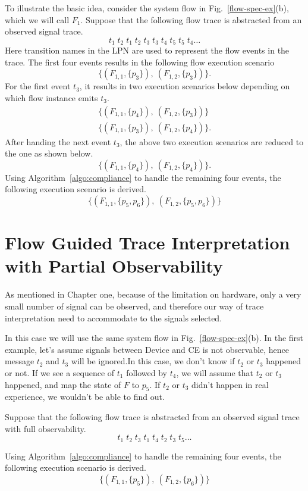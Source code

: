 \documentclass[12pt,frontmatter,copyright,thesis]{usfmanus}
\begin{document}
To illustrate the basic idea, consider the system flow in
Fig.~\ref{flow-spec-ex}(b), which we will call $F_1$.
Suppose that the following flow trace is abstracted from an
observed signal trace.
\[
	t_1\;t_2\;t_1\;t_2\;t_3\;t_3\;t_4\;t_5\;t_5\;t_4\ldots
\]  
Here transition names in the LPN are used to represent the 
flow events in the trace.  The first four events results in
the following flow execution scenario
\[
	\{(F_{1,1}, \{p_3\}),~(F_{1,2}, \{p_3\})\}.
\]
For the first event $t_3$, it results in two execution scenarios 
below depending on which flow instance emits $t_3$.
\[
\begin{array}{l}
	\{(F_{1,1}, \{p_4\}),~(F_{1,2}, \{p_3\})\} \\
	\{(F_{1,1}, \{p_3\}),~(F_{1,2}, \{p_4\})\}.
\end{array}
\]
After handing the next event $t_3$, the above two execution scenarios
are reduced to the one as shown below.
\[
	\{(F_{1,1}, \{p_4\}),~(F_{1,2}, \{p_4\})\}.
\]
Using Algorithm~\ref{algo:compliance} to handle the
remaining four events, the following execution scenario is
derived.
\[
	\{(F_{1,1}, \{p_5, p_6\}),~(F_{1,2}, \{p_5, p_6\})\}
\]
 



\section{Flow Guided Trace Interpretation with Partial Observability}

As mentioned in Chapter one, because of the limitation on hardware, only
a very small number of signal can be observed, and therefore our way of trace interpretation need
to accommodate to the signals selected.

In this case we will use the same system flow in
Fig.~\ref{flow-spec-ex}(b).
In the first example, let's assume signals between Device and CE is not observable, hence message
$t_2$ and $t_3$ will be ignored.In this case, we don't know if $t_2$ or $t_3$ happened or
not. If we see a sequence of $t_1$ followed by $t_4$, we will assume that $t_2$ or $t_3$
happened, and map the state of $F$ to $p_5$. If $t_2$ or $t_3$ didn't happen in real experience,
we wouldn't be able to find out. 

Suppose that the following flow trace is abstracted from an
observed signal trace with full observability.
\[
	t_1\;t_2\;t_3\;t_1\;t_4\;t_2\;t_3\;t_5\ldots
\]

Using Algorithm~\ref{algo:compliance} to handle the
remaining four events, the following execution scenario is
derived.
\[
	\{(F_{1,1}, \{p_5\}),~(F_{1,2}, \{p_6\})\}
\]
\end{document}
